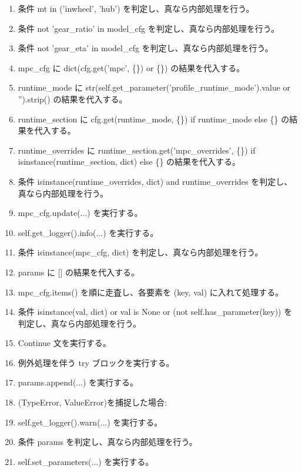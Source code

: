 \documentclass[a4paper,11pt]{article}
\begin{document}
\begin{enumerate}[leftmargin=1.8em]
\item     条件 mt in ('inwheel', 'hub') を判定し、真なら内部処理を行う。
\item       条件 not 'gear\_ratio' in model\_cfg を判定し、真なら内部処理を行う。
\item       条件 not 'gear\_eta' in model\_cfg を判定し、真なら内部処理を行う。
\item mpc\_cfg に dict(cfg.get('mpc', \{\}) or \{\}) の結果を代入する。
\item runtime\_mode に str(self.get\_parameter('profile\_runtime\_mode').value or '').strip() の結果を代入する。
\item runtime\_section に cfg.get(runtime\_mode, \{\}) if runtime\_mode else \{\} の結果を代入する。
\item runtime\_overrides に runtime\_section.get('mpc\_overrides', \{\}) if isinstance(runtime\_section, dict) else \{\} の結果を代入する。
\item 条件 isinstance(runtime\_overrides, dict) and runtime\_overrides を判定し、真なら内部処理を行う。
\item   mpc\_cfg.update(...) を実行する。
\item   self.get\_logger().info(...) を実行する。
\item 条件 isinstance(mpc\_cfg, dict) を判定し、真なら内部処理を行う。
\item   params に [] の結果を代入する。
\item   mpc\_cfg.items() を順に走査し、各要素を (key, val) に入れて処理する。
\item     条件 isinstance(val, dict) or val is None or (not self.has\_parameter(key)) を判定し、真なら内部処理を行う。
\item       Continue 文を実行する。
\item     例外処理を伴う try ブロックを実行する。
\item       params.append(...) を実行する。
\item       (TypeError, ValueError)を捕捉した場合:
\item       self.get\_logger().warn(...) を実行する。
\item   条件 params を判定し、真なら内部処理を行う。
\item     self.set\_parameters(...) を実行する。
            \end{enumerate}
\end{document}
